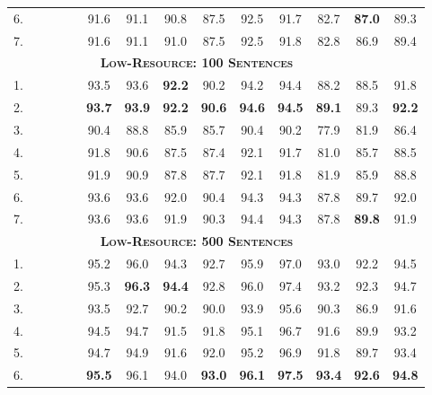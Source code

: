 \documentclass[11pt,a4paper]{article}
\newcommand{\cmark}{\textcolor{blue}{\ding{51}}}
\newcommand{\xmark}{\textcolor{red}{\ding{55}}}
\begin{document}
\begin{table*}[ht]
\begin{tabular}{l|cccc||cccccccc|c}
6. & \cmark & \cmark & \cmark & \xmark & 91.6 & 91.1 & 90.8 & 87.5 & 92.5 & 91.7 & 82.7 & \textbf{87.0} & 89.3 \\
7. & \cmark & \cmark & \cmark & \cmark & 91.6 & 91.1 & 91.0 & 87.5 & 92.5 & 91.8 & 82.8 & 86.9 & 89.4 \\
\hline\hline
\multicolumn{13}{c}{\bf \textsc{Low-Resource: 100 Sentences}}\\
\hline
1. & \xmark & \cmark & \xmark & \xmark & 93.5 & 93.6 & \textbf{92.2} & 90.2 & 94.2 & 94.4 & 88.2 & 88.5 & 91.8 \\
2. & \xmark & \cmark & \cmark & \xmark & \textbf{93.7} & \textbf{93.9} & \textbf{92.2} & \textbf{90.6} & \textbf{94.6} & \textbf{94.5} & \textbf{89.1} & 89.3 & \textbf{92.2} \\
3. & \cmark & \xmark & \xmark & \xmark & 90.4 & 88.8 & 85.9 & 85.7 & 90.4 & 90.2 & 77.9 & 81.9 & 86.4 \\
4. & \cmark & \xmark & \cmark & \xmark & 91.8 & 90.6 & 87.5 & 87.4 & 92.1 & 91.7 & 81.0 & 85.7 & 88.5 \\
5. & \cmark & \xmark & \cmark & \cmark & 91.9 & 90.9 & 87.8 & 87.7 & 92.1 & 91.8 & 81.9 & 85.9 & 88.8 \\
6. & \cmark & \cmark & \cmark & \xmark & 93.6 & 93.6 & 92.0 & 90.4 & 94.3 & 94.3 & 87.8 & 89.7 & 92.0 \\
7. & \cmark & \cmark & \cmark & \cmark & 93.6 & 93.6 & 91.9 & 90.3 & 94.4 & 94.3 & 87.8 & \textbf{89.8} & 91.9 \\
\hline\hline
\multicolumn{13}{c}{\bf \textsc{Low-Resource: 500 Sentences}}\\
\hline
1. & \xmark & \cmark & \xmark & \xmark & 95.2 & 96.0 & 94.3 & 92.7 & 95.9 & 97.0 & 93.0 & 92.2 & 94.5 \\
2. & \xmark & \cmark & \cmark & \xmark & 95.3 & \textbf{96.3} & \textbf{94.4} & 92.8 & 96.0 & 97.4 & 93.2 & 92.3 & 94.7 \\
3. & \cmark & \xmark & \xmark & \xmark & 93.5 & 92.7 & 90.2 & 90.0 & 93.9 & 95.6 & 90.3 & 86.9 & 91.6 \\
4. & \cmark & \xmark & \cmark & \xmark & 94.5 & 94.7 & 91.5 & 91.8 & 95.1 & 96.7 & 91.6 & 89.9 & 93.2 \\
5. & \cmark & \xmark & \cmark & \cmark & 94.7 & 94.9 & 91.6 & 92.0 & 95.2 & 96.9 & 91.8 & 89.7 & 93.4 \\
6. & \cmark & \cmark & \cmark & \xmark & \textbf{95.5} & 96.1 & 94.0 & \textbf{93.0} & \textbf{96.1} & \textbf{97.5} & \textbf{93.4} & \textbf{92.6} & \textbf{94.8} \\

\end{tabular}
\end{table*}
\end{document}
